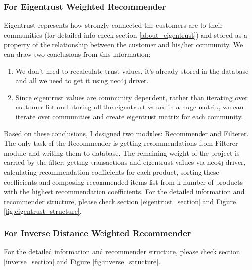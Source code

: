 \subsubsection{For Eigentrust Weighted Recommender}
Eigentrust represents how strongly connected the customers are to their communities (for detailed info check section \ref{about_eigentrust}) and stored as a property of the relationship between the customer and his/her community. We can draw two conclusions from this information;
\begin{enumerate}
	\item We don't need to recalculate trust values, it's already stored in the database and all we need to get it using neo4j driver.
	\item Since eigentrust values are community dependent, rather than iterating over customer list and storing all the eigentrust values in a huge matrix, we can iterate over communities and create eigentrust matrix for each community.
\end{enumerate}
Based on these conclusions, I designed two modules: Recommender and Filterer. The only task of the Recommender is getting recommendations from Filterer module and writing them to database.  The remaining weight of the project is carried by the filter: getting transactions and eigentrust values via neo4j driver, calculating recommendation coefficients for each product, sorting these coefficients and composing recommended items list from k number of products with the highest recommendation coefficients. For the detailed information and recommender structure, please check section \ref{eigentrust_section} and Figure \ref{fig:eigentrust_structure}.
\subsubsection{For Inverse Distance Weighted Recommender}
For the detailed information and recommender structure, please check section \ref{inverse_section} and Figure \ref{fig:inverse_structure}.